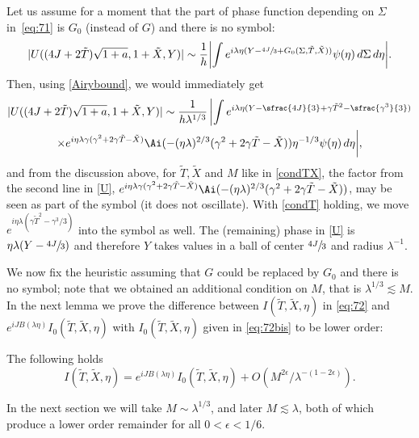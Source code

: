 Let us assume for a moment that the part of phase function depending on $\Sigma$ in~\eqref{eq:71} is $G_0$ (instead of $G$) and there is no symbol: 
\[
|U((4J+2\tilde T)\sqrt{1+a},1+\tilde X,Y)| \sim \frac 1h \biggl| \int e^{i\lambda\eta (Y-\sfrac{4J}{3}+G_0(\Sigma,\tilde T,\tilde X))}\psi(\eta) \,d\Sigma \,d\eta \biggr|.
\]
Then, using \eqref{Airybound}, we would immediately get
\begin{multline}\label{U}
|U((4J+2\tilde T)\sqrt{1+a},1+\tilde X,Y)|\sim \frac{1}{h\lambda^{1/3}}\,\biggl|\int e^{i\lambda\eta (Y-\sfrac{4J}{3}+\gamma \tilde T^2-\sfrac{\gamma^3}{3})}\\\times e^{i\eta \lambda \gamma(\gamma^2+2\gamma \tilde T-\tilde X)}\Ai(-(\eta\lambda)^{2/3}(\gamma^2+2\gamma \tilde T-\tilde X))\eta^{-1/3}\psi(\eta)\,d\eta\biggr|,
\end{multline}
and from the discussion above, for $\tilde T,\tilde X$ and $M$ like in \eqref{condTX}, the factor from the second line in \eqref{U},
$e^{i\eta \lambda \gamma(\gamma^2+2\gamma \tilde T-\tilde X)}\Ai(-(\eta\lambda)^{2/3}(\gamma^2+2\gamma \tilde T-\tilde X))$, may be seen as part of the symbol (it does not oscillate). With \eqref{condT} holding, we move $e^{i\eta \lambda(\gamma \tilde T^2-\gamma^3/3)}$ into the symbol as well.
The (remaining) phase in \eqref{U} is $\eta \lambda (Y-\sfrac{4J}{3})$ and therefore $Y$ takes values in a ball of center $\sfrac{4J}{3}$ and radius $\lambda^{-1}$.

We now fix the heuristic assuming that $G$ could be replaced by $G_0$ and there is no symbol; note that we obtained an additional condition on $M$, that is $\lambda^{1/3}\lesssim M$. In the next lemma we prove the difference between $I(\tilde T,\tilde X,\eta)$ in \eqref{eq:72} and $e^{iJB(\lambda\eta)} I_0(\tilde T,\tilde X,\eta)$ with $I_0(\tilde T,\tilde X,\eta)$ given in \eqref{eq:72bis} to be lower order:
\begin{lemma}
The following holds
\[
I(\tilde T,\tilde X,\eta)=e^{iJB(\lambda\eta)}I_0(\tilde T,\tilde X,\eta)+O(M^{2\epsilon}/\lambda^{-(1-2\epsilon)}).
\]
\end{lemma}
\begin{rmq}
In the next section we will take $M\sim \lambda^{1/3}$, and later $M\lesssim \lambda$, both of which produce a lower order remainder for all $0<\epsilon<1/6$.
\end{rmq}

